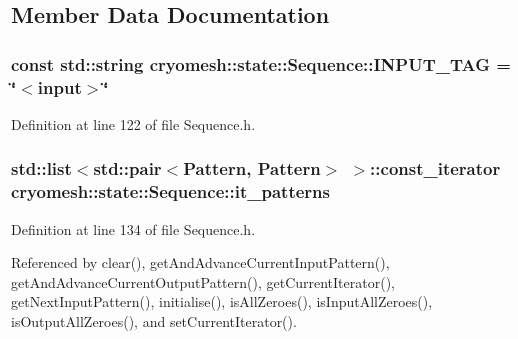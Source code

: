 \subsection{\-Member \-Data \-Documentation}
\hypertarget{classcryomesh_1_1state_1_1Sequence_ad84c6b3291384cd1db8235d735fa7589}{
\subsubsection[{\-I\-N\-P\-U\-T\-\_\-\-T\-A\-G}]{\setlength{\rightskip}{0pt plus 5cm}const std\-::string {\bf cryomesh\-::state\-::\-Sequence\-::\-I\-N\-P\-U\-T\-\_\-\-T\-A\-G} = \char`\"{}$<$input$>$\char`\"{}}}\label{classcryomesh_1_1state_1_1Sequence_ad84c6b3291384cd1db8235d735fa7589}


\-Definition at line 122 of file \-Sequence.\-h.

\hypertarget{classcryomesh_1_1state_1_1Sequence_a790c73a269a6a5840faea86b59d25926}{
\subsubsection[{it\-\_\-patterns}]{\setlength{\rightskip}{0pt plus 5cm}std\-::list$<$std\-::pair$<${\bf \-Pattern}, {\bf \-Pattern}$>$ $>$\-::const\-\_\-iterator {\bf cryomesh\-::state\-::\-Sequence\-::it\-\_\-patterns}}}\label{classcryomesh_1_1state_1_1Sequence_a790c73a269a6a5840faea86b59d25926}


\-Definition at line 134 of file \-Sequence.\-h.



\-Referenced by clear(), get\-And\-Advance\-Current\-Input\-Pattern(), get\-And\-Advance\-Current\-Output\-Pattern(), get\-Current\-Iterator(), get\-Next\-Input\-Pattern(), initialise(), is\-All\-Zeroes(), is\-Input\-All\-Zeroes(), is\-Output\-All\-Zeroes(), and set\-Current\-Iterator().

